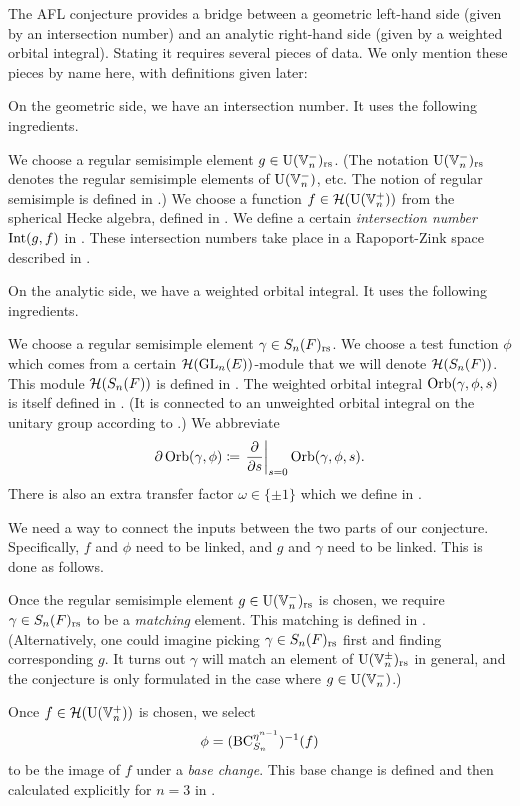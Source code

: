 The AFL conjecture provides a bridge between a geometric left-hand side
(given by an intersection number)
and an analytic right-hand side (given by a weighted orbital integral).
Stating it requires several pieces of data.
We only mention these pieces by name here, with definitions given later:
\begin{itemize}
  \ii On the geometric side, we have an intersection number.
  It uses the following ingredients.
  \begin{itemize}
    \ii We choose a regular semisimple element $g \in \operatorname{U}(\mathbb V_n^-)_{\mathrm{rs}}$.
    (The notation $\operatorname{U}(\mathbb V_n^-)_{\mathrm{rs}}$ denotes the regular semisimple elements of $\operatorname{U}(\mathbb V_n^-)$, etc.
    The notion of regular semisimple is defined in .)
    \ii We choose a function $f \in \mathcal H(\operatorname{U}(\mathbb V_n^+))$ from the spherical Hecke algebra,
    defined in .
    \ii We define a certain \emph{intersection number} $\operatorname{Int}(g, f)$
    in .
    These intersection numbers take place in a Rapoport-Zink space
    described in .
  \end{itemize}

  \ii On the analytic side, we have a weighted orbital integral.
  It uses the following ingredients.
  \begin{itemize}
    \ii We choose a regular semisimple element $\gamma \in S_n(F)_{\mathrm{rs}}$.
    \ii We choose a test function $\phi$ which comes
    from a certain $\mathcal H(\operatorname{GL}_n(E))$-module that we will denote $\mathcal H(S_n(F))$.
    This module $\mathcal H(S_n(F))$ is defined in .
    \ii The weighted orbital integral $\operatorname{Orb}(\gamma, \phi, s)$
    is itself defined in .
    (It is connected to an unweighted orbital integral on the unitary group
    according to .)
    We abbreviate
    \[ \partial \operatorname{Orb}(\gamma, \phi)
      \coloneqq \left. \pdv{}{s} \right\rvert_{s=0} \operatorname{Orb}(\gamma, \phi, s). \]
    \ii There is also an extra transfer factor $\omega \in \{\pm1\}$
    which we define in .
  \end{itemize}

  \ii We need a way to connect the inputs between the two parts of our conjecture.
  Specifically, $f$ and $\phi$ need to be linked, and $g$ and $\gamma$ need to be linked.
  This is done as follows.
  \begin{itemize}
    \ii Once the regular semisimple element $g \in \operatorname{U}(\mathbb V_n^-)_{\mathrm{rs}}$ is chosen,
    we require $\gamma \in S_n(F)_{\mathrm{rs}}$ to be a \emph{matching} element.
    This matching is defined in .
    (Alternatively, one could imagine picking $\gamma \in S_n(F)_{\mathrm{rs}}$ first
    and finding corresponding $g$.
    It turns out $\gamma$ will match an element of $\operatorname{U}(\mathbb V_n^\pm)_{\mathrm{rs}}$ in general,
    and the conjecture is only formulated in the case where $g \in \operatorname{U}(\mathbb V_n^-)$.)

    \ii Once $f \in \mathcal H(\operatorname{U}(\mathbb V_n^+))$ is chosen, we select
    \[ \phi = (\operatorname{BC}_{S_n}^{\eta^{n-1}})^{-1}(f) \]
    to be the image of $f$ under a \emph{base change}.
    This base change is defined and then calculated explicitly for $n = 3$ in .
  \end{itemize}
\end{itemize}

